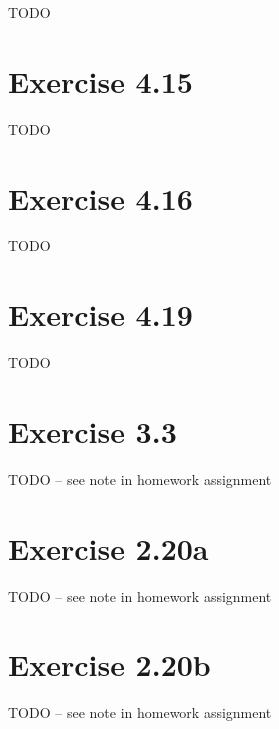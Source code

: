 \documentclass{article}
\begin{document}
TODO 

\section{Exercise 4.15}

TODO 

\section{Exercise 4.16}

TODO 

\section{Exercise 4.19}

TODO 

\section{Exercise 3.3}

TODO -- see note in homework assignment

\section{Exercise 2.20a}

TODO -- see note in homework assignment

\section{Exercise 2.20b}

TODO -- see note in homework assignment
\end{document}

